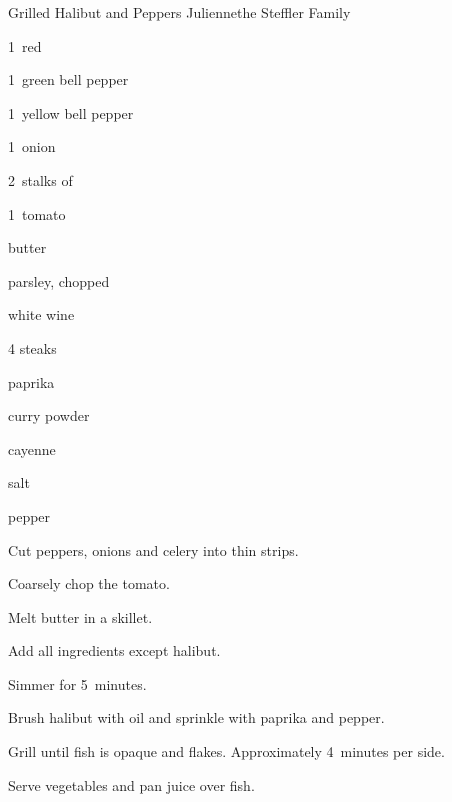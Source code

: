 \begin{recipe}{Grilled Halibut and Peppers Julienne}{the Steffler Family}{}

\begin{ingredients}
\item 1~red 
\item 1~green bell pepper
\item 1~yellow bell pepper
\item 1~onion
\item 2~stalks of  
\item 1~tomato
\item {} butter
\item {} parsley, chopped 
\item \C{\twothird} white wine
\item 4  steaks
\item paprika
\item curry powder
\item cayenne
\item salt
\item pepper
\end{ingredients}

\begin{directions}
\item Cut peppers, onions and celery into thin strips.
\item Coarsely chop the tomato.
\item Melt butter in a skillet.
\item Add all ingredients except halibut.
\item Simmer for 5~minutes.
\item Brush halibut with oil and sprinkle with paprika and pepper.
\item Grill until fish is opaque and flakes. Approximately 4~minutes per side.
\item Serve vegetables and pan juice over fish.
\end{directions}
\end{recipe}
